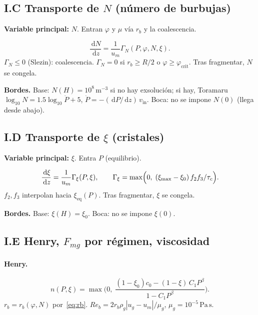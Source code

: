 \documentclass[11pt,a4paper]{article}
\newcommand{\dd}{\,\mathrm{d}}
\begin{document}
\subsection*{I.C Transporte de $N$ (número de burbujas)}

\textbf{Variable principal:} $N$. Entran $\varphi$ y $\mu$
vía $r_b$ y la coalescencia.

\begin{equation}
\label{eq:N-1d}
\frac{\dd N}{\dd z}
=\frac{1}{u_m}\Gamma_N(P,\varphi,N,\xi).
\end{equation}
$\Gamma_N\le 0$ (Slezin): coalescencia. $\Gamma_N=0$ si
$r_b\ge R/2$ o $\varphi\ge\varphi_{\mathrm{crit}}$. Tras
fragmentar, $N$ se congela.

\textbf{Bordes.} Base: $N(H)=10^8\,\mathrm{m^{-3}}$ si no hay
exsolución; si hay, Toramaru
$\log_{10}N=1.5\log_{10}\dot P+5$,
$\dot P=-(\dd P/\dd z)\,v_{\mathrm{in}}$.
Boca: no se impone $N(0)$ (llega desde abajo).

\subsection*{I.D Transporte de $\xi$ (cristales)}

\textbf{Variable principal:} $\xi$. Entra $P$ (equilibrio).

\begin{equation}
\label{eq:xi-1d}
\frac{\dd\xi}{\dd z}
=\frac{1}{u_m}\Gamma_\xi(P,\xi),
\qquad
\Gamma_\xi
=\max\Bigl(0,\;
(\xi_{\max}-\xi_0)\,f_2 f_3/\tau_c\Bigr).
\end{equation}
$f_2,f_3$ interpolan hacia $\xi_{\mathrm{eq}}(P)$. Tras
fragmentar, $\xi$ se congela.

\textbf{Bordes.} Base: $\xi(H)=\xi_0$. Boca: no se impone
$\xi(0)$.

\subsection*{I.E Henry, $F_{mg}$ por régimen, viscosidad}

\paragraph{Henry.}
\begin{equation}
\label{eq:henry}
n(P,\xi)
=\max\Biggl(0,\;
\frac{(1-\xi_0)c_0-(1-\xi)\,C_1 P^{\beta}}{1-C_1 P^{\beta}}\Biggr).
\end{equation}
$r_b=r_b(\varphi,N)$ por~\eqref{eq:rb}.
$Re_b=2r_b\rho_g|u_g-u_m|/\mu_g$, $\mu_g=10^{-5}\,\mathrm{Pa\,s}$.
\end{document}
